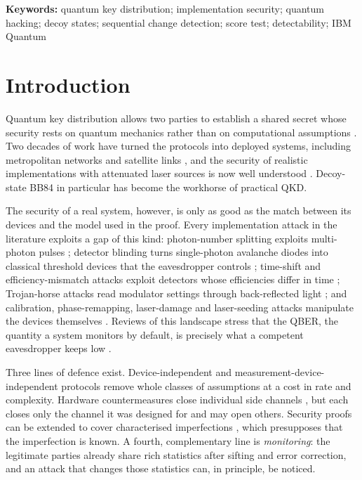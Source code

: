 \documentclass[11pt,a4paper]{article}
\theoremstyle{definition}
\theoremstyle{remark}
\begin{document}
\noindent\textbf{Keywords:} quantum key distribution; implementation security; quantum hacking; decoy states; sequential change detection; score test; detectability; IBM Quantum

\section{Introduction}\label{sec:intro}

Quantum key distribution allows two parties to establish a shared secret whose security rests on quantum mechanics rather than on computational assumptions \cite{BB84,Ekert1991,ShorPreskill2000}. Two decades of work have turned the protocols into deployed systems, including metropolitan networks and satellite links \cite{Liao2017,Chen2021}, and the security of realistic implementations with attenuated laser sources is now well understood \cite{GLLP2004,Hwang2003,LoMaChen2005,Wang2005,Ma2005,Scarani2009,Xu2020,Pirandola2020}. Decoy-state BB84 in particular has become the workhorse of practical QKD.

The security of a real system, however, is only as good as the match between its devices and the model used in the proof. Every implementation attack in the literature exploits a gap of this kind: photon-number splitting exploits multi-photon pulses \cite{Brassard2000,Lutkenhaus2000}; detector blinding turns single-photon avalanche diodes into classical threshold devices that the eavesdropper controls \cite{Lydersen2010,Gerhardt2011,Wiechers2011,Lydersen2011superlinear}; time-shift and efficiency-mismatch attacks exploit detectors whose efficiencies differ in time \cite{Makarov2006,Qi2007,Zhao2008}; Trojan-horse attacks read modulator settings through back-reflected light \cite{Gisin2006THA,Jain2014THA,Lucamarini2015}; and calibration, phase-remapping, laser-damage and laser-seeding attacks manipulate the devices themselves \cite{Jain2011calibration,XuQiLo2010,Bugge2014,Makarov2016,Huang2019seeding}. Reviews of this landscape stress that the QBER, the quantity a system monitors by default, is precisely what a competent eavesdropper keeps low \cite{Jain2016review,SunHuang2022,Diamanti2016}.

Three lines of defence exist. Device-independent and measurement-device-independent protocols remove whole classes of assumptions \cite{Acin2007,LoCurtyQi2012} at a cost in rate and complexity. Hardware countermeasures close individual side channels \cite{Lucamarini2015,Ponosova2022}, but each closes only the channel it was designed for and may open others. Security proofs can be extended to cover characterised imperfections \cite{Tamaki2016,Pereira2020,Zapatero2021}, which presupposes that the imperfection is known. A fourth, complementary line is \emph{monitoring}: the legitimate parties already share rich statistics after sifting and error correction, and an attack that changes those statistics can, in principle, be noticed.
\end{document}

